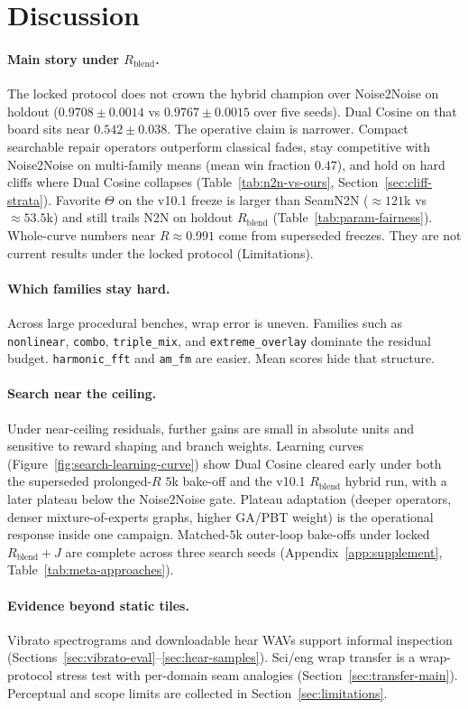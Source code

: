 \section{Discussion}
\label{sec:discussion}

\paragraph{Main story under $R_{\mathrm{blend}}$.}
The locked protocol does not crown the hybrid champion over Noise2Noise on holdout
($0.9708{\pm}0.0014$ vs $0.9767{\pm}0.0015$ over five seeds).
Dual Cosine on that board sits near $0.542{\pm}0.038$.
The operative claim is narrower.
Compact searchable repair operators outperform classical fades, stay competitive with Noise2Noise on multi-family means (mean win fraction $0.47$), and hold on hard cliffs where Dual Cosine collapses
(Table~\ref{tab:n2n-vs-ours}, Section~\ref{sec:cliff-strata}).
Favorite $\Theta$ on the v10.1 freeze is larger than SeamN2N (${\approx}121$k vs ${\approx}53.5$k) and still trails N2N on holdout $R_{\mathrm{blend}}$
(Table~\ref{tab:param-fairness}).
Whole-curve numbers near $R{\approx}0.991$ come from superseded freezes.
They are not current results under the locked protocol (Limitations).

\paragraph{Which families stay hard.}
Across large procedural benches, wrap error is uneven.
Families such as \texttt{nonlinear}, \texttt{combo}, \texttt{triple\_mix}, and \texttt{extreme\_overlay} dominate the residual budget.
\texttt{harmonic\_fft} and \texttt{am\_fm} are easier.
Mean scores hide that structure.

\paragraph{Search near the ceiling.}
Under near-ceiling residuals, further gains are small in absolute units and sensitive to reward shaping and branch weights.
Learning curves (Figure~\ref{fig:search-learning-curve}) show Dual Cosine cleared early under both the superseded prolonged-$R$ $5$k bake-off and the v10.1 $R_{\mathrm{blend}}$ hybrid run, with a later plateau below the Noise2Noise gate.
Plateau adaptation (deeper operators, denser mixture-of-experts graphs, higher GA/PBT weight) is the operational response inside one campaign.
Matched-$5$k outer-loop bake-offs under locked $R_{\mathrm{blend}}{+}J$ are complete across three search seeds (Appendix~\ref{app:supplement}, Table~\ref{tab:meta-approaches}).

\paragraph{Evidence beyond static tiles.}
Vibrato spectrograms and downloadable hear WAVs support informal inspection (Sections~\ref{sec:vibrato-eval}--\ref{sec:hear-samples}).
Sci/eng wrap transfer is a wrap-protocol stress test with per-domain seam analogies (Section~\ref{sec:transfer-main}).
Perceptual and scope limits are collected in Section~\ref{sec:limitations}.
